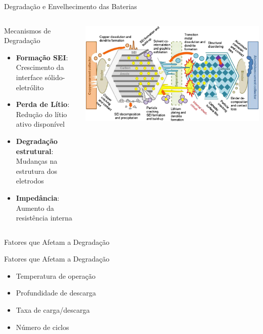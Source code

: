 \documentclass[aspectratio=169,xcolor=dvipsnames]{beamer}
\begin{document}
\begin{frame}{Degradação e Envelhecimento das Baterias}
  \begin{columns}[T]
    \begin{column}{0.5\textwidth}
      \begin{alertblock}{Mecanismos de Degradação}
        \begin{itemize}
          \item \textbf{Formação SEI}: Crescimento da interface sólido-eletrólito
          \item \textbf{Perda de Lítio}: Redução do lítio ativo disponível
          \item \textbf{Degradação estrutural}: Mudanças na estrutura dos eletrodos
          \item \textbf{Impedância}: Aumento da resistência interna
        \end{itemize}
      \end{alertblock}
    \end{column}
    \begin{column}{0.5\textwidth}
      \centering
      \includegraphics[width=\textwidth]{logos/Degradation mechanisms in Li-ion cells.jpg}
    \end{column}
  \end{columns}
\end{frame}

\begin{frame}{Fatores que Afetam a Degradação}
  \begin{exampleblock}{Fatores que Afetam a Degradação}
    \begin{itemize}
      \item Temperatura de operação
      \item Profundidade de descarga
      \item Taxa de carga/descarga
      \item Número de ciclos
    \end{itemize}
  \end{exampleblock}
\end{frame}
\end{document}
